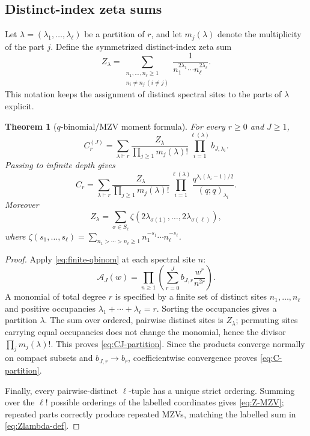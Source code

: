 \documentclass[11pt,oneside]{article}
\newtheorem{theorem}{Theorem}[section]
\theoremstyle{definition}
\theoremstyle{remark}
\begin{document}
\subsection{Distinct-index zeta sums}

Let $\lambda=(\lambda_1,\dots,\lambda_\ell)$ be a partition of $r$, and let
$m_j(\lambda)$ denote the multiplicity of the part $j$.  Define the
symmetrized distinct-index zeta sum
\begin{equation}\label{eq:Zlambda-def}
 Z_\lambda=
 \sum_{\substack{n_1,\dots,n_\ell\ge1\\ n_i\ne n_j\ (i\ne j)}}
 \frac1{n_1^{2\lambda_1}\cdots n_\ell^{2\lambda_\ell}}.
\end{equation}
This notation keeps the assignment of distinct spectral sites to the parts of
$\lambda$ explicit.

\begin{theorem}[$q$-binomial/MZV moment formula]\label{thm:q-mzv}
For every $r\ge0$ and $J\ge1$,
\begin{equation}\label{eq:CJ-partition}
 \boxed{
 C_r^{(J)}=
 \sum_{\lambda\vdash r}
 \frac{Z_\lambda}{\prod_{j\ge1}m_j(\lambda)!}
 \prod_{i=1}^{\ell(\lambda)}b_{J,\lambda_i}.}
\end{equation}
Passing to infinite depth gives
\begin{equation}\label{eq:C-partition}
 \boxed{
 C_r=
 \sum_{\lambda\vdash r}
 \frac{Z_\lambda}{\prod_{j\ge1}m_j(\lambda)!}
 \prod_{i=1}^{\ell(\lambda)}
 \frac{q^{\lambda_i(\lambda_i-1)/2}}{(q;q)_{\lambda_i}}.}
\end{equation}
Moreover
\begin{equation}\label{eq:Z-MZV}
 Z_\lambda=\sum_{\sigma\in S_\ell}
 \zeta(2\lambda_{\sigma(1)},\dots,2\lambda_{\sigma(\ell)}),
\end{equation}
where
$\zeta(s_1,\dots,s_\ell)=\sum_{n_1>\cdots>n_\ell\ge1}
 n_1^{-s_1}\cdots n_\ell^{-s_\ell}$.
\end{theorem}

\begin{proof}
Apply \cref{eq:finite-qbinom} at each spectral site $n$:
\[
 \mathcal A_J(w)=\prod_{n\ge1}
 \left(\sum_{r=0}^{J}b_{J,r}\frac{w^r}{n^{2r}}\right).
\]
A monomial of total degree $r$ is specified by a finite set of distinct sites
$n_1,\dots,n_\ell$ and positive occupancies
$\lambda_1+\cdots+\lambda_\ell=r$.  Sorting the occupancies gives a partition
$\lambda$.  The sum over ordered, pairwise distinct sites is $Z_\lambda$;
permuting sites carrying equal occupancies does not change the monomial, hence
the divisor $\prod_jm_j(\lambda)!$.  This proves
\cref{eq:CJ-partition}.  Since the products converge normally on compact
subsets and $b_{J,r}\to b_r$, coefficientwise convergence proves
\cref{eq:C-partition}.

Finally, every pairwise-distinct $\ell$-tuple has a unique strict ordering.
Summing over the $\ell!$ possible orderings of the labelled coordinates gives
\cref{eq:Z-MZV}; repeated parts correctly produce repeated MZVs, matching the
labelled sum in \cref{eq:Zlambda-def}.
\end{proof}
\end{document}
